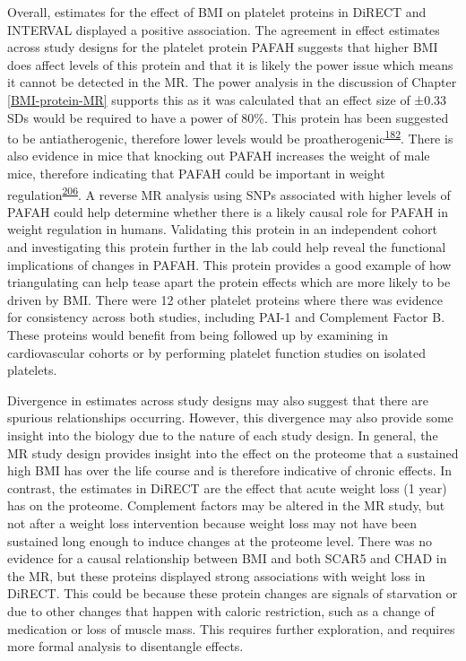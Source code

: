 \documentclass[11pt,twoside]{bristolthesis}
\begin{document}
Overall, estimates for the effect of BMI on platelet proteins in DiRECT and INTERVAL displayed a positive association. The agreement in effect estimates across study designs for the platelet protein PAFAH suggests that higher BMI does affect levels of this protein and that it is likely the power issue which means it cannot be detected in the MR. The power analysis in the discussion of Chapter \ref{BMI-protein-MR} supports this as it was calculated that an effect size of ±0.33 SDs would be required to have a power of 80\%. This protein has been suggested to be antiatherogenic, therefore lower levels would be proatherogenic\textsuperscript{\protect\hyperlink{ref-Noto2003}{182}}. There is also evidence in mice that knocking out PAFAH increases the weight of male mice, therefore indicating that PAFAH could be important in weight regulation\textsuperscript{\protect\hyperlink{ref-Nakamura2021}{206}}. A reverse MR analysis using SNPs associated with higher levels of PAFAH could help determine whether there is a likely causal role for PAFAH in weight regulation in humans. Validating this protein in an independent cohort and investigating this protein further in the lab could help reveal the functional implications of changes in PAFAH. This protein provides a good example of how triangulating can help tease apart the protein effects which are more likely to be driven by BMI. There were 12 other platelet proteins where there was evidence for consistency across both studies, including PAI-1 and Complement Factor B. These proteins would benefit from being followed up by examining in cardiovascular cohorts or by performing platelet function studies on isolated platelets.

Divergence in estimates across study designs may also suggest that there are spurious relationships occurring. However, this divergence may also provide some insight into the biology due to the nature of each study design. In general, the MR study design provides insight into the effect on the proteome that a sustained high BMI has over the life course and is therefore indicative of chronic effects. In contrast, the estimates in DiRECT are the effect that acute weight loss (1 year) has on the proteome. Complement factors may be altered in the MR study, but not after a weight loss intervention because weight loss may not have been sustained long enough to induce changes at the proteome level. There was no evidence for a causal relationship between BMI and both SCAR5 and CHAD in the MR, but these proteins displayed strong associations with weight loss in DiRECT. This could be because these protein changes are signals of starvation or due to other changes that happen with caloric restriction, such as a change of medication or loss of muscle mass. This requires further exploration, and requires more formal analysis to disentangle effects.
\end{document}
